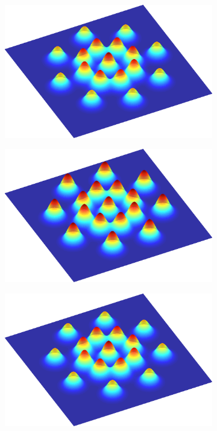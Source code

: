 \documentclass[thesis.tex]{subfiles}
\begin{document}
\begin{figure}[H]
\begin{subfigure}[t]{0.49\textwidth}
        \caption{}
        \label{fig:cellLayoutPolar}
    \end{subfigure}
	\begin{subfigure}[t]{0.49\textwidth}
        \includegraphics[width=\textwidth]{img/cellLayoutPolarCenter.png}
        \caption{}
        \label{fig:cellLayoutPolarCenter}
    \end{subfigure}
	\begin{subfigure}[t]{0.49\textwidth}
        \includegraphics[width=\textwidth]{img/cellLayoutConcentricPolar.png}
        \caption{}
        \label{fig:cellLayoutConcentricPolar}
    \end{subfigure}
	\begin{subfigure}[t]{0.49\textwidth}
        \includegraphics[width=\textwidth]{img/cellLayoutConcentricPolarCenter.png}

\end{subfigure}
\end{figure}
\end{document}
